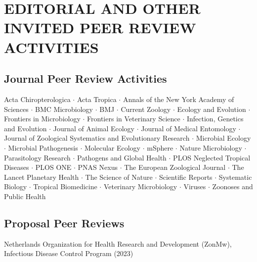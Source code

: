 \documentclass{cv}
\begin{document}

\section*{EDITORIAL AND OTHER INVITED PEER REVIEW ACTIVITIES}

\subsection*{Journal Peer Review Activities}

Acta Chiropterologica $\cdot$ Acta Tropica $\cdot$ Annals of the New York Academy of Sciences $\cdot$ BMC Microbiology $\cdot$ BMJ $\cdot$ Current Zoology $\cdot$ Ecology and Evolution $\cdot$ Frontiers in Microbiology $\cdot$ Frontiers in Veterinary Science $\cdot$ Infection, Genetics and Evolution $\cdot$ Journal of Animal Ecology $\cdot$ Journal of Medical Entomology $\cdot$ Journal of Zoological Systematics and Evolutionary Research $\cdot$ Microbial Ecology $\cdot$ Microbial Pathogenesis $\cdot$ Molecular Ecology $\cdot$ mSphere $\cdot$ Nature Microbiology $\cdot$ Parasitology Research $\cdot$ Pathogens and Global Health $\cdot$ PLOS Neglected Tropical Diseases $\cdot$ PLOS ONE $\cdot$ PNAS Nexus $\cdot$ The European Zoological Journal $\cdot$ The Lancet Planetary Health $\cdot$ The Science of Nature $\cdot$ Scientific Reports $\cdot$ Systematic Biology $\cdot$ Tropical Biomedicine $\cdot$ Veterinary Microbiology $\cdot$ Viruses $\cdot$ Zoonoses and Public Health

\subsection*{Proposal Peer Reviews}

Netherlands Organization for Health Research and Development (ZonMw), Infectious Disease Control Program (2023)



\end{document}
